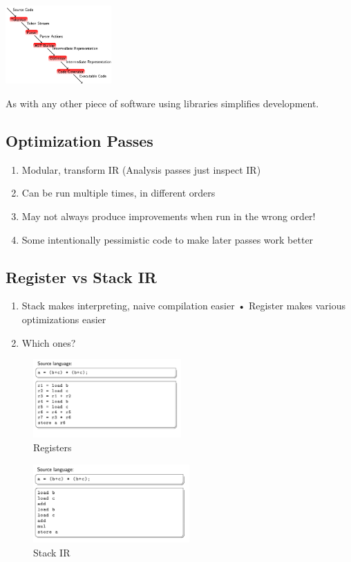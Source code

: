 \documentclass[a4paper]{exam}
\theoremstyle{definition}
\begin{document}
\begin{center}
  \includegraphics[height=3cm]{img/Snipaste_2021-04-05_17-18-11.png}
\end{center}

As with any other piece of software using libraries simplifies development.

\subsection{Optimization Passes}
\begin{enumerate}
  \item  Modular, transform IR (Analysis passes just inspect IR)
  \item Can be run multiple times, in different orders
  \item May not always produce improvements when run in the wrong order!
  \item Some intentionally pessimistic code to make later passes work better
\end{enumerate}

\subsection{Register vs Stack IR}
\begin{enumerate}
  \item Stack makes interpreting, naive compilation easier • Register makes various optimizations easier
  \item Which ones?
\end{enumerate}
  \begin{figure}[h]
    \centering
    \includegraphics[height=3cm]{img/Snipaste_2021-04-05_17-25-13.png}
    \caption{Registers}
  \end{figure}

  \begin{figure}[h]
    \centering
    \includegraphics[height=3cm]{img/Snipaste_2021-04-05_17-27-00.png}
    \caption{Stack IR}
  \end{figure}
\end{document}
